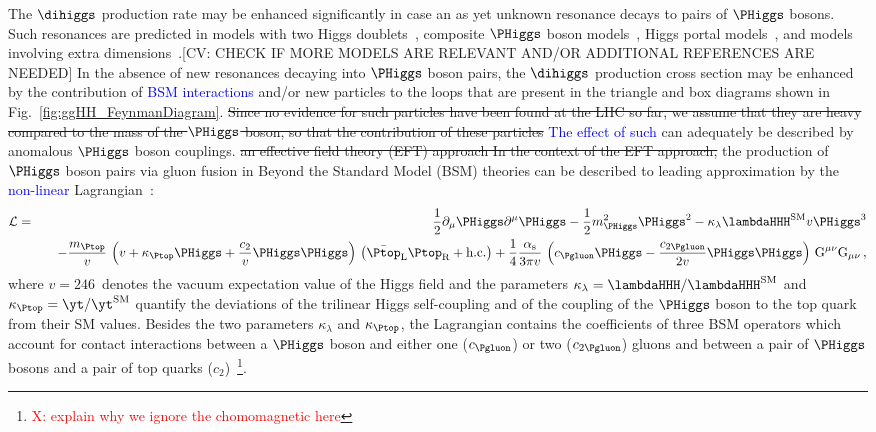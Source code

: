 The $\dihiggs$ production rate may be enhanced significantly in case an as yet unknown resonance decays to pairs of $\PHiggs$ bosons.
Such resonances are predicted in models with two Higgs doublets~\cite{Branco:2011iw}, composite $\PHiggs$ boson models~\cite{Grober:2010yv,Contino:2010mh}, 
Higgs portal models~\cite{Patt:2006fw}, and models involving extra dimensions~\cite{Randall:1999ee}.[CV: CHECK IF MORE MODELS ARE RELEVANT AND/OR ADDITIONAL REFERENCES ARE NEEDED]
In the absence of new resonances decaying into $\PHiggs$ boson pairs,
the $\dihiggs$ production cross section may be enhanced by the contribution of \textcolor{blue}{BSM interactions} and/or new particles to the loops 
that are present in the triangle and box diagrams shown in Fig.~\ref{fig:ggHH_FeynmanDiagram}.
\st{Since no evidence for such particles have been found at the LHC so far,
we assume that they are heavy compared to the mass of the $\PHiggs$ boson, 
so that the contribution of these particles }
\textcolor{blue}{The effect of such}  can adequately be described by anomalous $\PHiggs$ boson couplings. \st{an effective field theory (EFT) approach
In the context of the EFT approach,}
the production of $\PHiggs$ boson pairs via gluon fusion in Beyond the Standard Model (BSM) theories can be described to leading approximation by the \textcolor{blue}{non-linear}  Lagrangian~\cite{Buchmuller:1985jz}:
\begin{eqnarray}
\mathcal{L} & = & \frac{1}{2} \partial_{\mu}\PHiggs\partial^{\mu}\PHiggs - \frac{1}{2} m_{\PHiggs}^{2} \PHiggs^{2} - \kappa_{\lambda} \lambdaHHH^{\textrm{SM}} v \PHiggs^{3} \nonumber \\
 & & \quad -\frac{m_{\Ptop}}{v} \, \left( v + \kappa_{\Ptop} \PHiggs + \frac{c_{2}}{v} \PHiggs\PHiggs \right) \, \left( \bar{\Ptop}_{\textrm{L}} \Ptop_{\textrm{R}} + \textrm{h.c.} \right) 
+ \frac{1}{4} \frac{\alpha_{\textrm{s}}}{3 \pi v} \, \left( c_{\Pgluon} \PHiggs - \frac{c_{2\Pgluon}}{2 v} \PHiggs\PHiggs \right) \, \textrm{G}^{\mu\nu}\textrm{G}_{\mu\nu} \, ,
\end{eqnarray}
where $v = 246$~\GeV denotes the vacuum expectation value of the Higgs field
and the parameters $\kappa_{\lambda} = \lambdaHHH/\lambdaHHH^{\textrm{SM}}$ and $\kappa_{\Ptop} = \yt/\yt^{\textrm{SM}}$ 
quantify the deviations of the trilinear Higgs self-coupling and of the coupling of the $\PHiggs$ boson to the top quark from their SM values.
Besides the two parameters $\kappa_{\lambda}$ and $\kappa_{\Ptop}$,
the Lagrangian contains the coefficients of three BSM operators which account for contact interactions 
between a $\PHiggs$ boson and either one ($c_{\Pgluon}$) or two ($c_{2\Pgluon}$) gluons
and between a pair of $\PHiggs$ bosons and a pair of top quarks ($c_{2}$)~\footnote{ \textcolor{red}{X: explain why we ignore the chomomagnetic here}}.

